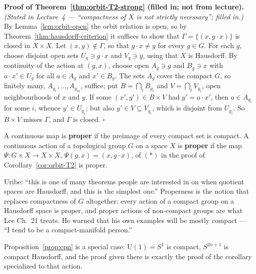\documentclass[11pt]{report}
\makeatletter
\newcounter{defcounter}[section]
\renewenvironment{proof}[1][Proof]{\noindent\textbf{#1.} }{\hfill$\square$\par\vspace{5pt}}
\newcommand{\deflabel}[1]{\edef\@currentlabel{\arabic{section}.\arabic{defcounter}}\label{#1}}
\newcommand{\Ugp}{\mathrm{U}}
\newcommand{\leeref}[1]{\par\smallskip{\raggedleft\footnotesize\textsc{Lee}:\ #1\par}}
\makeatother
\begin{document}
\begin{proof}[Proof of Theorem~\ref{thm:orbit-T2-strong} (filled in; not from lecture)]
\textit{(Stated in Lecture~4 --- ``compactness of $X$ is not strictly necessary''; filled in.)} By Lemma~\ref{lem:orbit-open} the orbit relation is open, so by Theorem~\ref{thm:hausdorff-criterion} it suffices to show that $\Gamma = \{(x, g\cdot x)\}$ is closed in $X \times X$. Let $(x, y) \notin \Gamma$, so that $g \cdot x \ne y$ for every $g \in G$. For each $g$, choose disjoint open sets $U_g \ni g \cdot x$ and $V_g \ni y$, using that $X$ is Hausdorff. By continuity of the action at $(g, x)$, choose open $A_g \ni g$ and $B_g \ni x$ with $a \cdot x' \in U_g$ for all $a \in A_g$ and $x' \in B_g$. The sets $A_g$ cover the compact $G$, so finitely many, $A_{g_1}, \ldots, A_{g_m}$, suffice; put $B = \bigcap_i B_{g_i}$ and $V = \bigcap_i V_{g_i}$, open neighbourhoods of $x$ and $y$. If some $(x', y') \in B \times V$ had $y' = a \cdot x'$, then $a \in A_{g_i}$ for some $i$, whence $y' \in U_{g_i}$; but also $y' \in V \subseteq V_{g_i}$, which is disjoint from $U_{g_i}$. So $B \times V$ misses $\Gamma$, and $\Gamma$ is closed.
\end{proof}

\begin{defbox}\deflabel{def:proper}
A continuous map is \textbf{proper} if the preimage of every compact set is compact. A continuous action of a topological group $G$ on a space $X$ is \textbf{proper} if the map $\Psi : G \times X \to X \times X$, $\Psi(g,x) = (x, g\cdot x)$, of $(\ast)$ in the proof of Corollary~\ref{cor:orbit-T2} is proper.
\leeref{Ch.~21, \emph{Proper Actions}}
\end{defbox}

\begin{rembox}\label{rem:proper-actions}
Uribe: ``this is one of many theorems people are interested in on when quotient spaces are Hausdorff, and this is the simplest one.'' Properness is the notion that replaces compactness of $G$ altogether: every action of a compact group on a Hausdorff space is proper, and proper actions of non-compact groups are what Lee Ch.\ 21 treats. He warned that his own examples will be mostly compact --- ``I tend to be a compact-manifold person.''
\end{rembox}

\begin{rembox}\label{rem:actions-3}
Proposition~\ref{prop:cpn} is a special case: $\Ugp(1) = S^1$ is compact, $S^{2n+1}$ is compact Hausdorff, and the proof given there is exactly the proof of the corollary specialized to that action.
\end{rembox}
\end{document}
